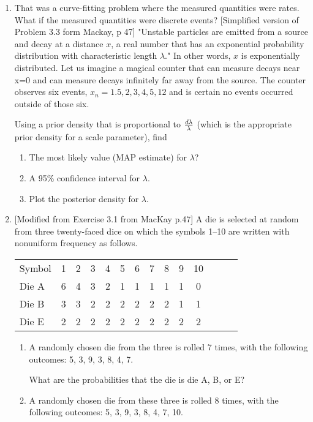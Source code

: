\documentclass[12pt]{book}
\theoremstyle{definition}
\begin{document}
\begin{enumerate}
\item\label{breaths}
That was a curve-fitting problem where the measured quantities were rates.  What if the measured quantities were discrete events?
[Simplified version of Problem 3.3 form Mackay, p 47] 
"Unstable particles are emitted from a source and decay at a distance $x$, a real number that has an exponential probability distribution with characteristic length $\lambda $."  In other words, $x$ is exponentially distributed.
Let us imagine a magical counter that can measure decays near x=0 and can measure decays infinitely far away from the source.  The counter observes six events, ${x_n} =  {1.5,2,3,4,5,12}$ and is certain no events occurred outside of those six. 

Using a prior density that is proportional to ${d\lambda }\over {\lambda}$ (which is the appropriate prior density for a scale parameter), find 
\begin{enumerate}
\item	The most likely value (MAP estimate) for $\lambda$? 
\item   A 95\% confidence interval for $\lambda$.
 
\item Plot the posterior density for $\lambda$.

\end{enumerate}

\item\label{toscientific}
[Modified from Exercise 3.1 from MacKay p.47] 
A die is selected at random from three twenty-faced dice on which the symbols 1–10 are written with nonuniform frequency as follows.

\begin{tabular} {l c c c c c c c c c c c c c }
Symbol& 1& 2 &3 &4 &5 &6 &7 &8 &9 &10 \\
Die A & 6& 4 &3 &2 &1 &1 &1 &1 &1 &0  \\
Die B & 3 &3 &2 &2 &2 &2 &2 &2 &1 &1 \\
Die E & 2 &2 &2 &2 &2 &2 &2& 2& 2& 2 \\
\end{tabular}

\begin{enumerate}
\item
A randomly chosen die from the three is rolled 7 times, with the following outcomes: 5, 3, 9, 3, 8, 4, 7.

What are the probabilities that the die is die A, B, or E?


\item
A randomly chosen die from these three is rolled 8 times, with the following outcomes: 5, 3, 9, 3, 8, 4, 7, 10. 


\end{enumerate}
\end{enumerate}
\end{document}
